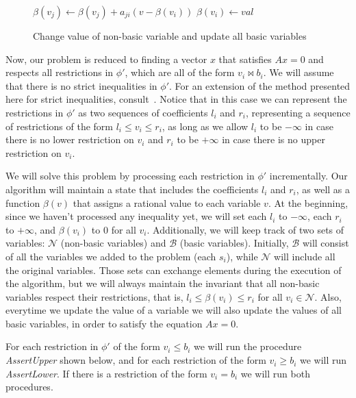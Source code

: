 \begin{figure}[t]
\begin{algorithmic}[1]
    \State $\beta(v_{j}) \gets \beta(v_{j}) + a_{ji}(v - \beta(v_{i}))$
  \EndFor
    \State $\beta(v_{i}) \gets val$
  \EndProcedure
\end{algorithmic}
\caption{Change value of non-basic variable and update all basic variables}
\end{figure}

Now, our problem is reduced to finding a vector $x$ that satisfies $Ax = 0$ and respects all restrictions in $\phi'$, which are all of the form $v_{i} \bowtie b_{i}$. We will assume that there is no strict inequalities in $\phi'$. For an extension of the method presented here for strict inequalities, consult~\cite{simplex_dpllt}. Notice that in this case we can represent the restrictions in $\phi'$ as two sequences of coefficients $l_{i}$ and $r_{i}$, representing a sequence of restrictions of the form $l_{i} \le v_{i} \le r_{i}$, as long as we allow $l_{i}$ to be $-\infty$ in case there is no lower restriction on $v_{i}$ and $r_{i}$ to be $+\infty$ in case there is no upper restriction on $v_{i}$.

We will solve this problem by processing each restriction in $\phi'$ incrementally. Our algorithm will maintain a state that includes the coefficients $l_{i}$ and $r_{i}$, as well as a function $\beta(v)$ that assigns a rational value to each variable $v$. At the beginning, since we haven't processed any inequality yet, we will set each $l_{i}$ to $-\infty$, each $r_{i}$ to $+\infty$, and $\beta(v_{i})$ to $0$ for all $v_{i}$. Additionally, we will keep track of two sets of variables: $\mathcal{N}$ (non-basic variables) and $\mathcal{B}$ (basic variables). Initially, $\mathcal{B}$ will consist of all the variables we added to the problem (each $s_{i}$), while $\mathcal{N}$ will include all the original variables.
Those sets can exchange elements during the execution of the algorithm, but we will always maintain the invariant that all non-basic variables respect their restrictions, that is, $l_{i} \le \beta(v_{i}) \le r_{i}$ for all $v_{i} \in \mathcal{N}$. Also, everytime we update the value of a variable we will also update the values of all basic variables, in order to satisfy the equation $Ax = 0$.

For each restriction in $\phi'$ of the form $v_{i} \le b_{i}$ we will run the procedure \textit{AssertUpper} shown below, and for each restriction of the form $v_{i} \ge b_{i}$ we will run \textit{AssertLower}. If there is a restriction of the form $v_{i} = b_{i}$ we will run both procedures.

